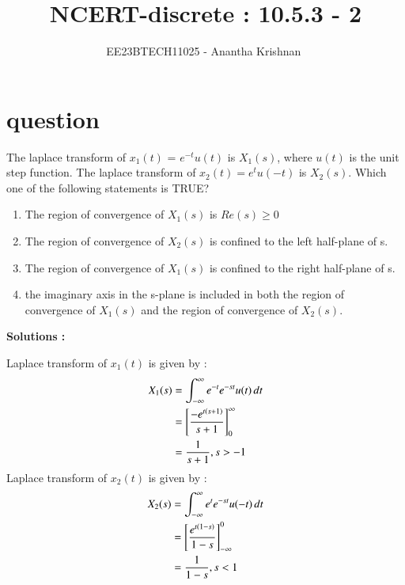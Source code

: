 \documentclass[journal,12pt,onecolumn]{IEEEtran}
\theoremstyle{remark}
\begin{document}

\vspace{3cm}

\title{NCERT-discrete : 10.5.3 - 2}
\author{EE23BTECH11025 - Anantha Krishnan $^{}$%
}
\maketitle
\bigskip



\section{question}

The laplace transform of $x_1(t)$ = $e^{-t}u(t)$ is $X_1(s)$, where $u(t)$ is the unit step function. The laplace transform of $x_2(t) = e^tu(-t)$ is $X_2(s)$. Which one of the following statements is TRUE?
\begin{enumerate}
    \item The region of convergence of $X_1(s)$ is $Re(s) \geq 0$
    \item The region of convergence of $X_2(s)$ is confined to the left half-plane of s.
    \item The region of convergence of $X_1(s)$ is confined to the right half-plane of s.
    \item the imaginary axis in the s-plane is included in both the region of convergence of $X_1(s)$ and the region of convergence of $X_2(s)$.
\end{enumerate}
 



\textbf{Solutions :}
    
Laplace transform of $x_1(t)$ is given by :
\begin{align}
    X_1(s) &=  \int_{-\infty}^{\infty} e^{-t}e^{-st}u(t) \,dt\\
       &=  \left[\frac{-e^{t\left(s+1\right)}}{s+1}\right]_{0}^{\infty}\\
&= \frac{1}{s+1} , s > -1
\end{align}
Laplace transform of $x_2(t)$ is given by :
\begin{align}
    X_2(s) &=  \int_{-\infty}^{\infty} e^{t}e^{-st}u(-t) \,dt\\
     &=  \left[\frac{e^{t\left(1-s\right)}}{1-s}\right]_{-\infty}^{0}\\
&= \frac{1}{1-s} , s < 1
\end{align}
\end{document}
